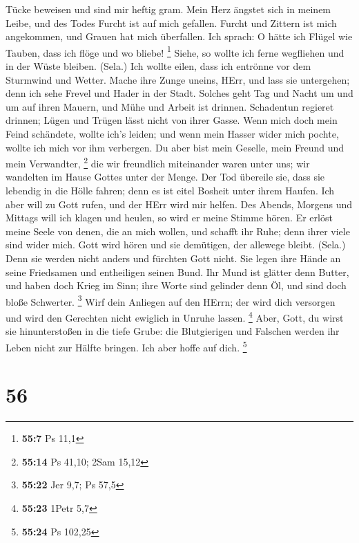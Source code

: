 Tücke beweisen und sind mir heftig gram.  Mein Herz ängstet
sich in meinem Leibe, und des Todes Furcht ist auf mich gefallen.
 Furcht und Zittern ist mich angekommen, und Grauen hat mich
überfallen.  Ich sprach: O hätte ich Flügel wie Tauben, dass
ich flöge und wo bliebe! \footnote{\textbf{55:7} Ps 11,1} 
Siehe, so wollte ich ferne wegfliehen und in der Wüste bleiben. (Sela.)
 Ich wollte eilen, dass ich entrönne vor dem Sturmwind und
Wetter.  Mache ihre Zunge uneins, HErr, und lass sie
untergehen; denn ich sehe Frevel und Hader in der Stadt. 
Solches geht Tag und Nacht um und um auf ihren Mauern, und Mühe und
Arbeit ist drinnen.  Schadentun regieret drinnen; Lügen und
Trügen lässt nicht von ihrer Gasse.  Wenn mich doch mein
Feind schändete, wollte ich's leiden; und wenn mein Hasser wider mich
pochte, wollte ich mich vor ihm verbergen.  Du aber bist
mein Geselle, mein Freund und mein Verwandter, \footnote{\textbf{55:14}
  Ps 41,10; 2Sam 15,12}  die wir freundlich miteinander
waren unter uns; wir wandelten im Hause Gottes unter der Menge.
 Der Tod übereile sie, dass sie lebendig in die Hölle
fahren; denn es ist eitel Bosheit unter ihrem Haufen.  Ich
aber will zu Gott rufen, und der HErr wird mir helfen.  Des
Abends, Morgens und Mittags will ich klagen und heulen, so wird er meine
Stimme hören.  Er erlöst meine Seele von denen, die an mich
wollen, und schafft ihr Ruhe; denn ihrer viele sind wider mich.
 Gott wird hören und sie demütigen, der allewege bleibt.
(Sela.) Denn sie werden nicht anders und fürchten Gott nicht.
 Sie legen ihre Hände an seine Friedsamen und entheiligen
seinen Bund.  Ihr Mund ist glätter denn Butter, und haben
doch Krieg im Sinn; ihre Worte sind gelinder denn Öl, und sind doch
bloße Schwerter. \footnote{\textbf{55:22} Jer 9,7; Ps 57,5}
 Wirf dein Anliegen auf den HErrn; der wird dich versorgen
und wird den Gerechten nicht ewiglich in Unruhe lassen. \footnote{\textbf{55:23}
  1Petr 5,7}  Aber, Gott, du wirst sie hinunterstoßen in
die tiefe Grube: die Blutgierigen und Falschen werden ihr Leben nicht
zur Hälfte bringen. Ich aber hoffe auf dich. \footnote{\textbf{55:24} Ps
  102,25}

\hypertarget{section-22}{%
\section{56}\label{section-22}}

